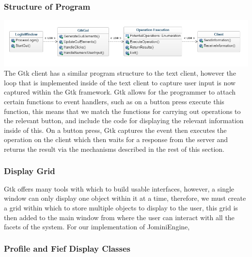 \documentclass{article}
\begin{document}
\subsubsection{Structure of Program}
\includegraphics[width=\textwidth]{gtkclient.png}
The Gtk client has a similar program structure to the text client, however the loop that is implemented inside of the text client to capture user input is now captured within the Gtk framework. Gtk allows for the programmer to attach certain functions to event handlers, such as on a button press execute this function, this means that we match the functions for carrying out operations to the relevant button, and include the code for displaying the relevant information inside of this. On a button press, Gtk captures the event then executes the operation on the client which then waits for a response from the server and returns the result via the mechanisms described in the rest of this section.

\subsubsection{Display Grid}
Gtk offers many tools with which to build usable interfaces, however, a single window can only display one object within it at a time, therefore, we must create a grid within which to store multiple objects to display to the user, this grid is then added to the main window from where the user can interact with all the facets of the system. For our implementation of JominiEngine, 

\subsubsection{Profile and Fief Display Classes}
\end{document}
